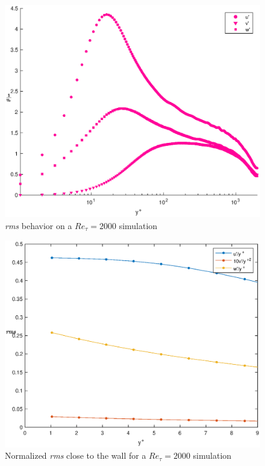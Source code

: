 \begin{figure}
\begin{center}
\includegraphics[scale=0.55]{grafici/rms_2000.eps}
\caption{\emph{rms} behavior on a $Re_{\tau}=2000$ simulation}
\label{rms:2000}
\end{center} 
\end{figure}

\begin{figure}
\begin{center}
\includegraphics[scale=0.55]{grafici/wall_rms_2000.eps}
\caption{Normalized \emph{rms} close to the wall for a $Re_{\tau}=2000$ simulation}
\label{wall:rms:2000}
\end{center} 
\end{figure}


